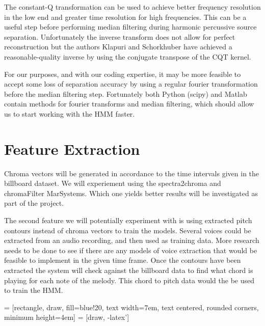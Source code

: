 \documentclass{article}
\begin{document}
The constant-Q transformation can be used to achieve better frequency resolution 
in the low end and greater time resolution for high frequencies. This can be a useful 
step before performing median filtering during harmonic percussive source separation. 
Unfortunately the inverse transform does not allow for perfect reconstruction but the 
authors Klapuri and Schorkhuber have achieved a reasonable-quality inverse by using the 
conjugate transpose of the CQT kernel.

For our purposes, and with our coding expertise, it may be more feasible to accept 
some loss of separation accuracy by using a regular fourier transformation before the 
median filtering step. Fortunately both Python (scipy) and Matlab contain methods for 
fourier transforms and median filtering, which should allow us to start working with 
the HMM faster.

\section{Feature Extraction}

Chroma vectors will be generated in accordance to the time intervals given in
the billboard dataset.  We will experiement using the spectra2chroma and chromaFilter
MarSystems. Which one yields better results will be investigated as part of the
project.

The second feature we will potentially experiment with is using extracted
pitch contours instead of chroma vectors to train the models. Several voices could
be extracted from an audio recording, and then used as training data. More research needs
to be done to see if there are any models of voice extraction that would be feasible to
implement in the given time frame. Once the contours have been extracted the system will
check against the billboard data to find what chord is playing for each note of the melody.
This chord to pitch data would the be used to train the HMM.

 = [rectangle, draw, fill=blue!20,
    text width=7em, text centered, rounded corners, minimum height=4em]
 = [draw, -latex']
\end{document}
